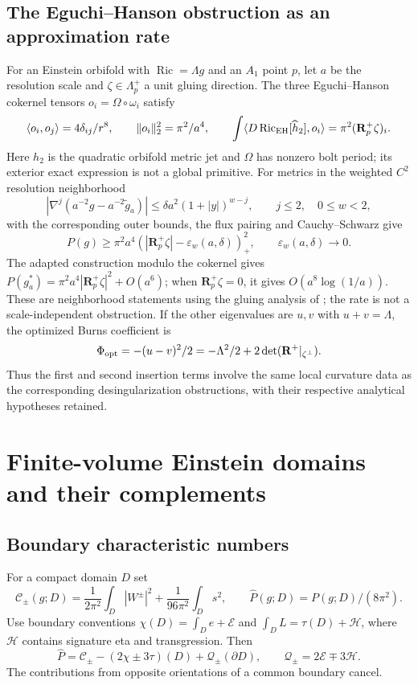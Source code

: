 \documentclass[11pt,a4paper]{article}
\theoremstyle{definition}\newtheorem{definition}[theorem]{Definition}
\theoremstyle{remark}\newtheorem{remark}[theorem]{Remark}
\newcommand{\Ric}{\operatorname{Ric}}
\newcommand{\eps}{\varepsilon}
\newcommand{\ip}[2]{\langle #1,#2\rangle}
\newcommand{\norm}[1]{\lVert #1\rVert}
\begin{document}
\subsection{The Eguchi--Hanson obstruction as an approximation rate}
For an Einstein orbifold with $\Ric=\Lambda g$ and an $A_1$ point $p$, let $a$ be the resolution scale and $\zeta\in\Lambda_p^+$ a unit gluing direction. The three Eguchi--Hanson cokernel tensors $o_i=\Omega\circ\omega_i$ satisfy
\[
 \ip{o_i}{o_j}=4\delta_{ij}/r^8,\qquad\norm{o_i}_2^2=\pi^2/a^4,
 \qquad
 \int\ip{D\Ric_{\rm EH}[\widehat h_2]}{o_i}
 =\pi^2(\mathbf R_p^+\zeta)_i.
\]
Here $h_2$ is the quadratic orbifold metric jet and $\Omega$ has nonzero bolt period; its exterior exact expression is not a global primitive. For metrics in the weighted $C^2$ resolution neighborhood
\[
 |\nabla^j(a^{-2}g-a^{-2}\widetilde g_a)|
 \le\delta a^2(1+|y|)^{w-j},\qquad j\le2,\quad0\le w<2,
\]
with the corresponding outer bounds, the flux pairing and Cauchy--Schwarz give
\begin{equation}\label{eq:EHrate}
 P(g)\ge\pi^2a^4(|\mathbf R_p^+\zeta|-\eps_w(a,\delta))_+^2,
 \qquad\eps_w(a,\delta)\to0.
\end{equation}
The adapted construction modulo the cokernel gives
$P(g_a^*)=\pi^2a^4|\mathbf R_p^+\zeta|^2+O(a^6)$; when $\mathbf R_p^+\zeta=0$, it gives $O(a^8\log(1/a))$. These are neighborhood statements using the gluing analysis of \cite{Ozuch}; the rate is not a scale-independent obstruction.
If the other eigenvalues are $u,v$ with $u+v=\Lambda$, the optimized Burns coefficient is
\[
 \Phi_{\rm opt}=-(u-v)^2/2=-\Lambda^2/2+2\det(\mathbf R^+|_{\zeta^\perp}).
\]
Thus the first and second insertion terms involve the same local curvature data as the corresponding desingularization obstructions, with their respective analytical hypotheses retained.

\section{Finite-volume Einstein domains and their complements}
\subsection{Boundary characteristic numbers}
For a compact domain $D$ set
\[
 \mathscr C_\pm(g;D)=\frac1{2\pi^2}\int_D|W^\pm|^2+\frac1{96\pi^2}\int_Ds^2,
 \qquad\widehat P(g;D)=P(g;D)/(8\pi^2).
\]
Use boundary conventions
$\chi(D)=\int_De+\mathscr E$ and $\int_DL=\tau(D)+\mathscr H$,
where $\mathscr H$ contains signature eta and transgression. Then
\begin{equation}\label{eq:boundary}
 \widehat P=\mathscr C_\pm-(2\chi\pm3\tau)(D)+\mathscr Q_\pm(\partial D),
 \qquad\mathscr Q_\pm=2\mathscr E\mp3\mathscr H.
\end{equation}
The contributions from opposite orientations of a common boundary cancel.
\end{document}
